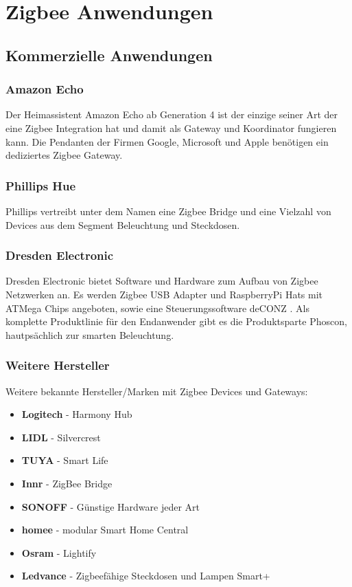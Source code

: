 \section{Zigbee Anwendungen}

\subsection{Kommerzielle Anwendungen}

\subsubsection{Amazon Echo}
    Der Heimassistent Amazon Echo ab Generation 4 ist der einzige seiner Art der eine Zigbee Integration hat und damit als Gateway und Koordinator fungieren
    kann. Die Pendanten der Firmen Google, Microsoft und Apple benötigen ein dediziertes Zigbee Gateway.

\subsubsection{Phillips Hue}
    Phillips vertreibt unter dem Namen eine Zigbee Bridge und eine Vielzahl von Devices aus dem Segment Beleuchtung und Steckdosen. 

\subsubsection{Dresden Electronic}
    Dresden Electronic bietet Software und Hardware zum Aufbau von Zigbee Netzwerken an. Es werden Zigbee USB Adapter und RaspberryPi Hats mit ATMega Chips angeboten,
    sowie eine Steuerungssoftware \grqq deCONZ \grqq{}. Als komplette Produktlinie für den Endanwender gibt es die Produktsparte
    \grqq Phoscon\grqq{}, hautpsächlich zur smarten Beleuchtung.

\subsubsection*{Weitere Hersteller}
Weitere bekannte Hersteller/Marken mit Zigbee Devices und Gateways:
\begin{itemize}
    \item \textbf{Logitech} - Harmony Hub
    \item \textbf{LIDL} - Silvercrest
    \item \textbf{TUYA} - Smart Life
    \item \textbf{Innr} - ZigBee Bridge
    \item \textbf{SONOFF} - Günstige Hardware jeder Art
    \item \textbf{homee} -  modular Smart Home Central
    \item \textbf{Osram} - Lightify
    \item \textbf{Ledvance} - Zigbeefähige Steckdosen und Lampen \grqq Smart+ \grqq{}
\end{itemize}

